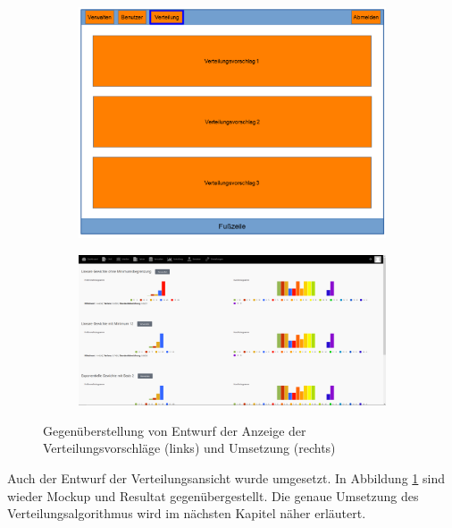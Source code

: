         \begin{figure}
            \centering
            \begin{subfigure}{0.49\textwidth}
                \includegraphics[width=1.0\textwidth]{./implementation/images/MockUpsBackend/backendDistribution.png}
            \end{subfigure}
            \begin{subfigure}{0.49\textwidth}
                \includegraphics[width=1.0\textwidth]{./implementation/images/distribution.png}
            \end{subfigure}
            \caption{Gegenüberstellung von Entwurf der Anzeige der Verteilungsvorschläge (links) und Umsetzung (rechts)}
            \label{fig:comparisonDistribution}
        \end{figure}
    
        Auch der Entwurf der Verteilungsansicht wurde umgesetzt.
        In Abbildung \ref{fig:comparisonDistribution} sind wieder Mockup und Resultat gegenübergestellt.
        Die genaue Umsetzung des Verteilungsalgorithmus wird im nächsten Kapitel näher erläutert.
        